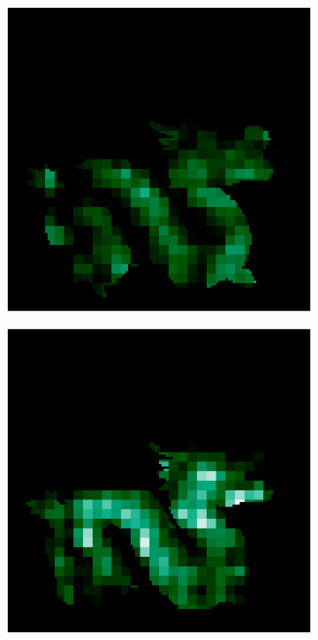 \begin{figure}[H]
\begin{minipage}{0.32\linewidth}
\begin{subfigure}[t]{0.45\linewidth}
				\end{subfigure}
		\end{minipage}
		\begin{minipage}{0.32\linewidth}
				\begin{subfigure}[t]{0.45\linewidth}
					\includegraphics[width=\linewidth]{./Figures/feature_map_gcnn/feature_map_gcnn-noc_7.png}
				\end{subfigure}
				\begin{subfigure}[t]{0.45\linewidth}
					\includegraphics[width=\linewidth]{./Figures/feature_map_gcnn/feature_map_gcnn-noc_25.png}
				\end{subfigure}
			

\end{minipage}
\end{figure}
